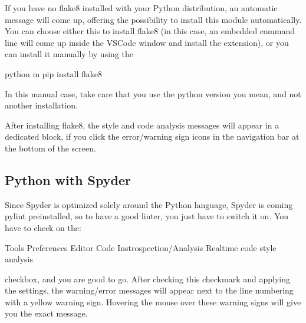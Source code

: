 \documentclass[letterpaper,10pt,english]{sphinxmanual}
\begin{document}
If you have no flake8 installed with your Python distribution, an automatic message will come up, offering the possibility to install this module automatically. You can choose either this to install flake8 (in this case, an embedded command line will come up inside the VSCode window and install the extension), or you can install it manually by using the

\begin{sphinxVerbatim}[commandchars=\\\{\}]
\PYGZgt{} python \PYGZhy{}m pip install flake8
\end{sphinxVerbatim}

In this manual case, take care that you use the python version you mean, and not another installation.

After installing flake8, the style and code analysis messages will appear in a dedicated block, if you click the error/warning sign icons in the navigation bar at the bottom of the screen.


\subsection{Python with Spyder}
\label{\detokenize{styleguide:python-with-spyder}}
Since Spyder is optimized solely around the Python language, Spyder is coming pylint preinstalled, so to have a good linter, you just have to switch it on. You have to check on the:

\begin{sphinxVerbatim}[commandchars=\\\{\}]
Tools \PYGZhy{}\PYGZhy{}\PYGZgt{} Preferences \PYGZhy{}\PYGZhy{}\PYGZgt{} Editor \PYGZhy{}\PYGZhy{}\PYGZgt{} Code Instrospection/Analysis \PYGZhy{}\PYGZhy{}\PYGZgt{}
Real\PYGZhy{}time code style analysis
\end{sphinxVerbatim}

checkbox, and you are good to go. After checking this checkmark and applying the settings, the warning/error messages will appear next to the line numbering with a yellow warning sign. Hovering the mouse over these warning signs will give you the exact message.
\end{document}
